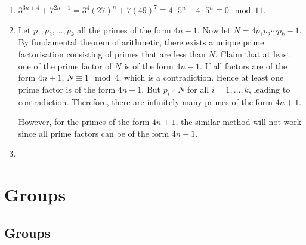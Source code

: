 \documentclass[10pt, a4paper, twoside]{report}
\begin{document}
\begin{enumerate}[{1.}]
    \item \(3^{3n+4}+7^{2n+1}=3^4(27)^n+7(49)^7\equiv 4\cdot 5^n-4\cdot 5^n\equiv 0\mod 11\).
    \item Let \(p_1,p_2,\ldots,p_k\) all the primes of the form \(4n-1\). Now let \(N=4p_1p_2\cdots p_k-1\). By fundamental theorem of arithmetic, there exists a unique prime factorisation consisting of primes that are less than \(N\). Claim that at least one of the prime factor of \(N\) is of the form \(4n-1\). If all factors are of the form \(4n+1\), \(N\equiv 1\mod 4\), which is a contradiction. Hence at least one prime factor is of the form \(4n+1\). But \(p_i\nmid N\) for all \(i=1,\ldots,k\), leading to contradiction. Therefore, there are infinitely many primes of the form \(4n+1\). 

    However, for the primes of the form \(4n+1\), the similar method will not work since all prime factors can be of the form \(4n-1\).
    \item 
\end{enumerate}
\chapter{Groups}
\section{Groups}
\end{document}
